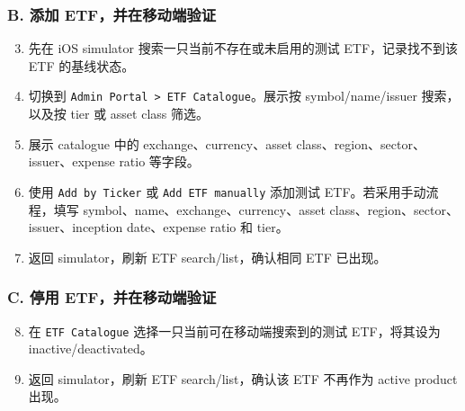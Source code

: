\subsubsection{B. 添加 ETF，并在移动端验证}
\begin{enumerate}
\setcounter{enumi}{2}
\item 先在 iOS simulator 搜索一只当前不存在或未启用的测试 ETF，记录找不到该 ETF 的基线状态。
\item 切换到 \texttt{Admin Portal \textgreater{} ETF Catalogue}。展示按 symbol/\allowbreak{}name/\allowbreak{}issuer 搜索，以及按 tier 或 asset class 筛选。
\item 展示 catalogue 中的 exchange、currency、asset class、region、sector、issuer、expense ratio 等字段。
\item 使用 \texttt{Add by Ticker} 或 \texttt{Add ETF manually} 添加测试 ETF。若采用手动流程，填写 symbol、name、exchange、currency、asset class、region、sector、issuer、inception date、expense ratio 和 tier。
\item 返回 simulator，刷新 ETF search/\allowbreak{}list，确认相同 ETF 已出现。
\end{enumerate}
\subsubsection{C. 停用 ETF，并在移动端验证}
\begin{enumerate}
\setcounter{enumi}{7}
\item 在 \texttt{ETF Catalogue} 选择一只当前可在移动端搜索到的测试 ETF，将其设为 inactive/\allowbreak{}deactivated。
\item 返回 simulator，刷新 ETF search/\allowbreak{}list，确认该 ETF 不再作为 active product 出现。
\end{enumerate}
